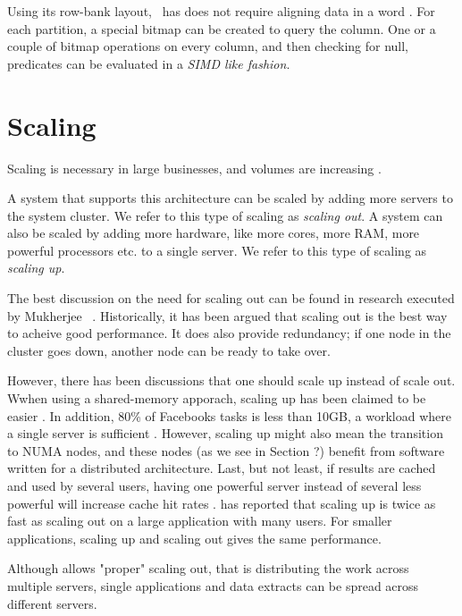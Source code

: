 Using its row-bank layout, \blink~has does not require aligning data in a word \cite{Johnson2008-cp}. For each partition, a special bitmap can be created to query the column. One or a couple of bitmap operations on every column, and then checking for null, predicates can be evaluated in a \textit{SIMD like fashion}.


\section{Scaling}
\label{sec:Scaling}
Scaling is necessary in large businesses, and volumes are increasing \cite{Qlik2012-ku}.

A system that supports this architecture can be scaled by adding more servers to the system cluster. We refer to this type of scaling as \textit{scaling out}. A system can also be scaled by adding more hardware, like more cores, more RAM, more powerful processors etc. to a single server. We refer to this type of scaling as \textit{scaling up}.

The best discussion on the need for scaling out can be found in research executed by Mukherjee \ea~\cite{Mukherjee2015-ul}. Historically, it has been argued that scaling out is the best way to acheive good performance. It does also provide redundancy; if one node in the cluster goes down, another node can be ready to take over.

However, there has been discussions that one should scale up instead of scale out. Wwhen using a shared-memory apporach, scaling up has been claimed to be easier \cite{Boncz2002-yj}. In addition, 80\% of Facebooks tasks is less than 10GB, a workload where a single server is sufficient \cite{Mukherjee2015-ul}. However, scaling up might also mean the transition to NUMA nodes, and these nodes (as we see in Section ?) benefit from software written for a distributed architecture. Last, but not least, if results are cached and used by several users, having one powerful server instead of several less powerful will increase cache hit rates \cite{qlik2012-ku}. \qlikview has reported that scaling up is twice as fast as scaling out on a large application with many users. For smaller applications, scaling up and scaling out gives the same performance.

Although \qlikview \cite{Qlik2012-ku} allows "proper" scaling out, that is distributing the work across multiple servers, single applications and data extracts can be spread across different servers. 



